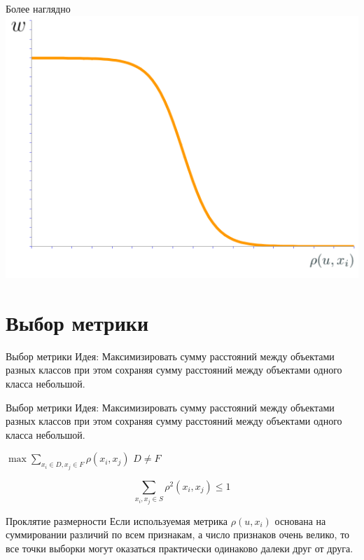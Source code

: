 \documentclass[10pt]{beamer}
\begin{document}
\begin{frame}{Более наглядно}
    \centering
	\includegraphics[width=\linewidth,height=\textheight,keepaspectratio]{images/parzen}
\end{frame}

\section{Выбор метрики}

\begin{frame}{Выбор метрики}
	\alert{Идея}: Максимизировать сумму расстояний между объектами разных классов
	при этом сохраняя сумму расстояний между объектами одного класса небольшой.\\
\end{frame}

\begin{frame}{Выбор метрики}
	\alert{Идея}: Максимизировать сумму расстояний между объектами разных классов
	при этом сохраняя сумму расстояний между объектами одного класса небольшой.\\
	\bigbreak
	\begin{center}
    	${\max \sum\limits_{x_i \in D, x_j \in F} \rho(x_i, x_j) }$ \hspace{5mm} $D \neq F$	
	\end{center}
	\bigbreak
	$${\sum\limits_{x_i, x_j \in S} \rho^2(x_i, x_j) \leq 1 }$$
\end{frame}

\begin{frame}{Проклятие размерности}
	\centering
	Если используемая метрика ${\rho(u, x_i)}$ основана на суммировании различий по всем признакам, а число признаков очень велико,
	то все точки выборки могут оказаться практически одинаково далеки друг от друга.\\
\end{frame}
\end{document}
